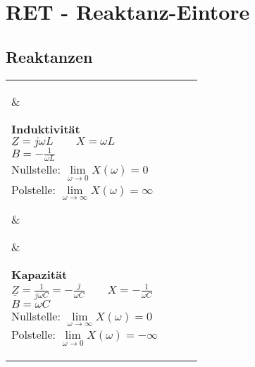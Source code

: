\section{RET - Reaktanz-Eintore}
\subsection{Reaktanzen}
	\begin{tabular}{ll ll}
		\parbox{4cm}{
		
			}
			& \parbox{5cm}{
				\textbf{Induktivität} \\
				$\underline{Z}=j\omega L \qquad X=\omega L$\\
				$B=-\frac{1}{\omega L}$\\
				Nullstelle: $\lim\limits_{\omega \rightarrow 0} X(\omega) = 0$ \\
				Polstelle: $\lim\limits_{\omega \rightarrow \infty} X(\omega) = \infty$ \\
			}
			
			& \parbox{4cm}{
			
			}
			& \parbox{5cm}{
				\textbf{Kapazität} \\
				$\underline{Z}=\frac{1}{j\omega C}=-\frac{j}{\omega C} \qquad X=-\frac{1}{\omega C}$\\
				$B=\omega C$ \\
				Nullstelle: $\lim\limits_{\omega \rightarrow \infty} X(\omega) = 0$ \\
				Polstelle: $\lim\limits_{\omega \rightarrow 0} X(\omega) = -\infty$ \\
			}
	\end{tabular}

